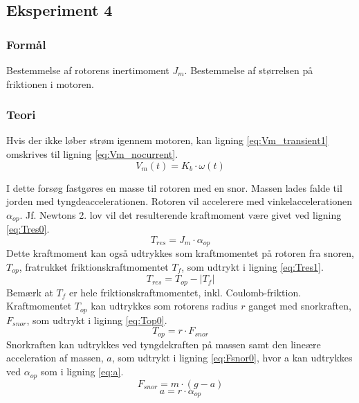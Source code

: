 \subsection{Eksperiment 4}
\subsubsection{Formål}
Bestemmelse af rotorens inertimoment \(J_m\).
Bestemmelse af størrelsen på friktionen i motoren.
\subsubsection{Teori}
Hvis der ikke løber strøm igennem motoren,
kan ligning \ref{eq:Vm_transient1} omskrives til ligning \ref{eq:Vm_nocurrent}.
\begin{equation}
	V_m(t)=K_b\cdot\omega(t)
	\label{eq:Vm_nocurrent}
 \end{equation}

I dette forsøg fastgøres en masse til rotoren med en snor.
Massen lades falde til jorden med tyngdeaccelerationen.
Rotoren vil accelerere med vinkelaccelerationen \(\alpha_{op}\).
Jf. Newtons 2. lov vil det resulterende kraftmoment være givet ved ligning \ref{eq:Tres0}.
\begin{equation}
	T_{res}=J_m\cdot\alpha_{op}
	\label{eq:Tres0}
 \end{equation}
Dette kraftmoment kan også udtrykkes som kraftmomentet på rotoren fra snoren, \(T_{op}\),
fratrukket friktionskraftmomentet \(T_f\), som udtrykt i ligning \ref{eq:Tres1}.
\begin{equation}
	T_{res}=T_{op}-\left|T_f\right|
	\label{eq:Tres1}
 \end{equation}
Bemærk at \(T_f\) er hele friktionskraftmomentet, inkl. Coulomb-friktion.
Kraftmomentet \(T_{op}\) kan udtrykkes som rotorens radius \(r\) ganget med snorkraften, \(F_{snor}\),
som udtrykt i liginng \ref{eq:Top0}.
\begin{equation}
	T_{op}=r\cdot{F_{snor}}
	\label{eq:Top0}
 \end{equation}
Snorkraften kan udtrykkes ved tyngdekraften på massen samt den lineære acceleration af massen, \(a\),
som udtrykt i ligning \ref{eq:Fsnor0}, hvor a kan udtrykkes ved \(\alpha_{op}\) som i ligning \ref{eq:a}.
\begin{equation}
	F_{snor}=m\cdot(g-a)
	\label{eq:Fsnor0}
 \end{equation}
\begin{equation}
	a=r\cdot\alpha_{op}
	\label{eq:a}
 \end{equation}

